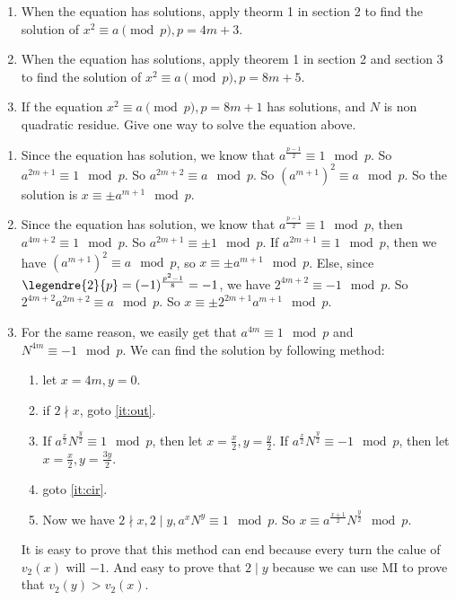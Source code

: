 \documentclass{ctexart}
\begin{document}
\begin{problem}\label{pro:2}
  \begin{enumerate}
    \item When the equation has solutions, apply theorm 1 in section 2 to
      find the solution of \(x^2 \equiv a \pmod{p}, p=4m + 3\).
    \item When the equation has solutions, apply theorem 1 in section 2 and section 3 to
      find the solution of \(x^2 \equiv a \pmod{p}, p=8m + 5\).
    \item If the equation \(x^2 \equiv a \pmod{p},p=8m + 1\) has solutions, and \(N \) is non quadratic residue.
      Give one way to solve the equation above.
  \end{enumerate}
\end{problem}
\begin{enumerate}
  \item Since the equation has solution, we know that \(a^{\frac{p-1}{2}}\equiv 1 \mod p\).
    So \(a^{2m+1} \equiv 1 \mod p\). So \(a^{2m+2}\equiv a \mod p\).
    So \((a^{m+1})^2 \equiv a \mod p\). So the solution is \(x \equiv \pm a^{m+1} \mod p\).
  \item Since the equation has solution, we know that \(a^{\frac{p-1}{2}} \equiv 1 \mod p\), then \(a^{4m+2} \equiv 1 \mod p\).
    So \(a^{2m+1} \equiv \pm 1 \mod p\).
    If \(a^{2m+1}\equiv 1 \mod p\), then we have \((a^{m+1})^2 \equiv a \mod p\), so \(x \equiv \pm a^{m+1} \mod p\).
    Else, since \(\legendre{2}{p}=(-1)^{\frac{p^2-1}{8}}=-1\), we have \(2^{4m+2} \equiv -1 \mod p\).
    So \(2^{4m+2} a^{2m+2}\equiv a \mod p\). So \(x \equiv \pm 2^{2m+1}a^{m+1} \mod p\).
  \item For the same reason, we easily get that \(a^{4m} \equiv 1 \mod p\) and \(N^{4m} \equiv -1 \mod p\).
    We can find the solution by following method:
    \begin{enumerate}
      \item let \(x=4m,y=0\).
      \item \label{it:cir}if \(2 \nmid x\), goto \ref{it:out}.
      \item If \(a^{\frac{x}{2}}N^{\frac{y}{2}} \equiv 1 \mod p\), then let \(x=\frac{x}{2},y=\frac{y}{2}\).
        If \(a^{\frac{x}{2}}N^{\frac{y}{2}} \equiv -1 \mod p\), then let \(x=\frac{x}{2},y=\frac{3y}{2}\).
      \item goto \ref{it:cir}.
      \item \label{it:out} Now we have \(2 \nmid x,2 \mid y,a^x N^y \equiv 1 \mod p\).
        So \(x \equiv a^{\frac{x+1}{2}}N^{\frac{y}{2}} \mod p\).
    \end{enumerate}
    It is easy to prove that this method can end because every turn the calue of \(v_2(x)\) will \(-1\).
    And easy to prove that \(2 \mid y\) because we can use MI to prove that \(v_2(y)>v_2(x)\).
\end{enumerate}
\end{document}
